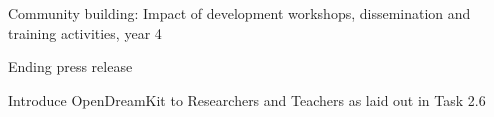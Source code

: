 \begin{workpackage}
\begin{wpdelivs}
  \begin{wpdeliv}[due=48,miles=eval,id=workshops-4,dissem=PU,nature=R,lead=PS,issue=40]{Community building: Impact of development workshops, dissemination and training activities, year 4}\end{wpdeliv}
  \begin{wpdeliv}[due=48,miles=eval,id=press-release-2,dissem=PU,nature=DEC,lead=PS,issue=41]{Ending press release}\end{wpdeliv}
\begin{wpdeliv}[due=48,miles=UI-vre,id=IntroODK,dissem=PU,nature=DEC,lead=USH,issue=250]{Introduce OpenDreamKit to Researchers and Teachers as laid out in Task 2.6}\end{wpdeliv}
\end{wpdelivs}
\end{workpackage}


